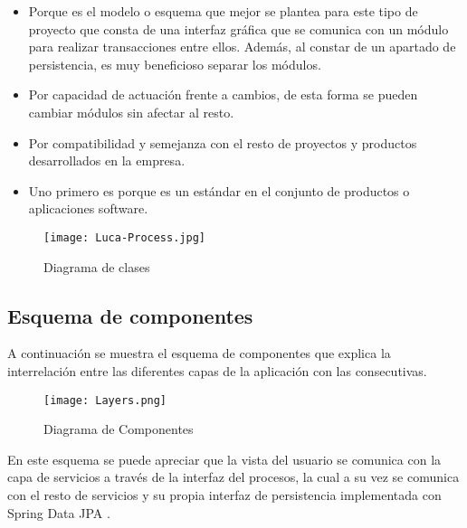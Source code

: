 		\begin{itemize}
			\item Porque es el modelo o esquema que mejor se plantea para este tipo de proyecto que consta de una interfaz gráfica que se comunica con un módulo para realizar transacciones entre ellos. Además, al constar de un apartado de persistencia, es muy beneficioso separar los módulos.
			\item Por capacidad de actuación frente a cambios, de esta forma se pueden cambiar módulos sin afectar al resto.
			\item Por compatibilidad y semejanza con el resto de proyectos y productos desarrollados en la empresa.
			\item Uno primero es porque es un estándar en el conjunto de productos o aplicaciones software.
		\end{itemize} 
		
		\begin{figure}[H]
			\centering
			\texttt{[image: Luca-Process.jpg]}
			\caption{Diagrama de clases}\label{fig:Luca-Process}
		\end{figure}
	
	
	\subsection{Esquema de componentes}
	
	A continuación se muestra el esquema de componentes que explica la interrelación entre las diferentes capas de la aplicación con las consecutivas.
	
	\begin{figure}[H]
		\centering
		\texttt{[image: Layers.png]}
		\caption{Diagrama de Componentes}\label{fig:Layers}
	\end{figure}

	
	En este esquema se puede apreciar que la vista del usuario se comunica con la capa de servicios a través de la interfaz del procesos, la cual a su vez se comunica con el resto de servicios y su propia interfaz de persistencia implementada con Spring Data JPA \cite{jpa}.
	